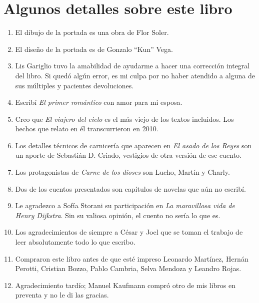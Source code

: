 \documentclass[11pt,twoside,openright]{book}
\begin{document}




























\cleardoublepage

{\small
\section*{Algunos detalles sobre este libro}

\begin{enumerate}
\item El dibujo de la portada es una obra de Flor Soler.
\item El diseño de la portada es de Gonzalo “Kun” Vega.
\item Lis Gariglio tuvo la amabilidad de ayudarme a hacer una corrección integral del libro. Si quedó algún error, es mi culpa por no haber atendido a alguna de sus múltiples y pacientes devoluciones.
\item Escribí \emph{El primer romántico} con amor para mi esposa.
\item Creo que \emph{El viajero del cielo} es el más viejo de los textos incluidos. Los hechos que  relato en él transcurrieron en 2010.
\item Los detalles técnicos de carnicería que aparecen en \emph{El asado de los Reyes} son un aporte de Sebastián D. Criado, vestigios de otra versión de ese cuento.
\item Los protagonistas de \emph{Carne de los dioses} son Lucho, Martín y Charly.
\item Dos de los cuentos presentados son capítulos de novelas que aún no escribí.
\item Le agradezco a Sofía Storani su participación en \emph{La maravillosa vida de Henry Dijkstra}. Sin su valiosa opinión, el cuento no sería lo que es.
\item Los agradecimientos de siempre a César y Joel que se toman el trabajo de leer absolutamente todo lo que escribo.
\item Compraron este libro antes de que esté impreso Leonardo Martínez, Hernán Perotti, Cristian Bozzo, Pablo Cambria, Selva Mendoza y Leandro Rojas.
\item Agradecimiento tardío; Manuel Kaufmann compró otro de mis libros en preventa y no le di las gracias.
\end{enumerate}
}
\end{document}
